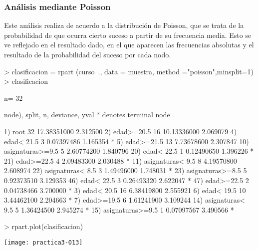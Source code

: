 \documentclass[a4paper]{article}
\begin{document}
\subsubsection{Análisis mediante Poisson}
Este análisis realiza de acuerdo a la distribución de Poisson, que se trata de la probabilidad de que ocurra cierto suceso a partir de su frecuencia media. Esto se ve reflejado en el resultado dado, en el que aparecen las frecuencias absolutas y el resultado de la probabilidad del suceso por cada nodo.
\begin{Schunk}
\begin{Sinput}
> clasificacion = rpart (curso~., data = muestra, method ="poisson",minsplit=1)
> clasificacion
\end{Sinput}
\begin{Soutput}
n= 32 

node), split, n, deviance, yval
      * denotes terminal node

 1) root 32 17.38351000 2.312500  
   2) edad>=20.5 16 10.13336000 2.069079  
     4) edad< 21.5 3  0.07397486 1.165354 *
     5) edad>=21.5 13  7.73678600 2.307847  
      10) asignaturas>=9.5 5  2.60774200 1.840796  
        20) edad< 22.5 1  0.12490650 1.396226 *
        21) edad>=22.5 4  2.09483300 2.030488 *
      11) asignaturas< 9.5 8  4.19570800 2.608974  
        22) asignaturas< 8.5 3  1.49496000 1.748031 *
        23) asignaturas>=8.5 5  0.92373510 3.129353  
          46) edad< 22.5 3  0.26493320 2.622047 *
          47) edad>=22.5 2  0.04738466 3.700000 *
   3) edad< 20.5 16  6.38419800 2.555921  
     6) edad< 19.5 10  3.44462100 2.204663 *
     7) edad>=19.5 6  1.61241900 3.109244  
      14) asignaturas< 9.5 5  1.36424500 2.945274 *
      15) asignaturas>=9.5 1  0.07097567 3.490566 *
\end{Soutput}
\begin{Sinput}
> rpart.plot(clasificacion)
\end{Sinput}
\end{Schunk}
\texttt{[image: practica3-013]}
\end{document}

